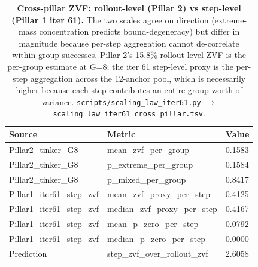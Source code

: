 \documentclass{article}
\begin{document}
\begin{table}[t]
  \centering
  \small
  \begin{tabular}{lll}
    \toprule
    Source & Metric & Value \\
    \midrule
    Pillar2_tinker_G8 & mean\_zvf\_per\_group & 0.1583 \\
    Pillar2_tinker_G8 & p\_extreme\_per\_group & 0.1584 \\
    Pillar2_tinker_G8 & p\_mixed\_per\_group & 0.8417 \\
    Pillar1_iter61_step_zvf & mean\_zvf\_proxy\_per\_step & 0.4125 \\
    Pillar1_iter61_step_zvf & median\_zvf\_proxy\_per\_step & 0.4167 \\
    Pillar1_iter61_step_zvf & mean\_p\_zero\_per\_step & 0.0792 \\
    Pillar1_iter61_step_zvf & median\_p\_zero\_per\_step & 0.0000 \\
    Prediction & step\_zvf\_over\_rollout\_zvf & 2.6058 \\
    \bottomrule
  \end{tabular}
  \caption{\textbf{Cross-pillar ZVF: rollout-level (Pillar 2) vs
    step-level (Pillar 1 iter 61).}  The two scales agree on
    direction (extreme-mass concentration predicts bound-degeneracy)
    but differ in magnitude because per-step aggregation cannot
    de-correlate within-group successes.  Pillar 2's 15.8\%
    rollout-level ZVF is the per-group estimate at G=8; the iter 61
    step-level proxy is the per-step aggregation across the
    12-anchor pool, which is necessarily higher because each
    step contributes an entire group worth of variance.
    \texttt{scripts/scaling\_law\_iter61.py}
    \(\to\) \texttt{scaling\_law\_iter61\_cross\_pillar.tsv}.}
  \label{tab:scaling-iter61-cross}
\end{table}
\end{document}
